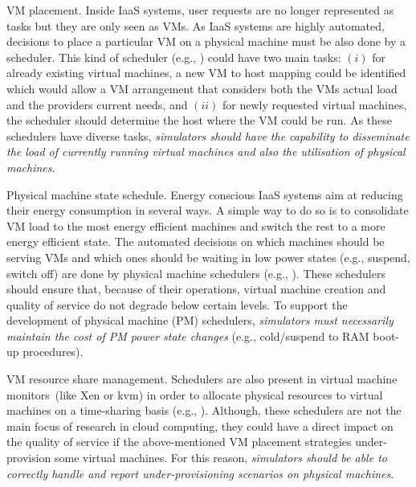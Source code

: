 \documentclass[sort, compress, 5p]{elsarticle}
\begin{document}
\begin{description*}
\item[VM placement.] Inside IaaS systems, user requests are no longer represented as tasks but they are only seen as VMs. As IaaS systems are highly automated, decisions to place a particular VM on a physical machine must be also done by a scheduler. This kind of scheduler (e.g., \cite{tsakalozos2011,6009246}) could have two main tasks: $(i)$ for already existing virtual machines, a new VM to host mapping could be identified which would allow a VM arrangement that considers both the VMs actual load and the providers current needs, and $(ii)$ for newly requested virtual machines, the scheduler should determine the host where the VM could be run. As these schedulers have diverse tasks, \emph{simulators should have the capability to disseminate the load of currently running virtual machines and also the utilisation of physical machines}.
\item[Physical machine state schedule.] Energy conscious IaaS systems aim at reducing their energy consumption in several ways. A simple way to do so is to consolidate VM load to the most energy efficient machines and switch the rest to a more energy efficient state. The automated decisions on which machines should be serving VMs and which ones should be waiting in low power states (e.g., suspend, switch off) are done by physical machine schedulers (e.g., \cite{5958802,6253507,Wang20131661}). These schedulers should ensure that, because of their operations, virtual machine creation and quality of service do not degrade below certain levels. To support the development of physical machine (PM) schedulers, \emph{simulators must necessarily maintain the cost of PM power state changes} (e.g., cold/suspend to RAM boot-up procedures).
\item[VM resource share management.] Schedulers are also present in virtual machine monitors~(like Xen or kvm) in order to allocate physical resources to virtual machines on a time-sharing basis (e.g., \cite{Ongaro:2008:SIV:1346256.1346258,5289182}). Although, these schedulers are not the main focus of research in cloud computing, they could have a direct impact on the quality of service if the above-mentioned VM placement strategies under-provision some virtual machines. For this reason, \emph{simulators should be able to correctly handle and report under-provisioning scenarios on physical machines}.

\end{description*}
\end{document}
